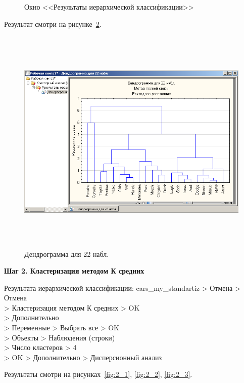 \begin{figure}[!h]
\begin{minipage}{0.32\textwidth}
    \caption{Окно <<Результаты иерархической классификации>>}
    \label{fig:1_6}
  \end{minipage}
\end{figure}

Результат смотри на рисунке~\ref{fig:1_7}.

\begin{figure}[!h]
  \centering

  \includegraphics[height=11cm]
  {inc/cars_my/1.7.PNG}

  \caption{Дендрограмма для 22 набл.}
  \label{fig:1_7}
\end{figure}

\newpage

\begin{center}
  \textbf{Шаг 2. Кластеризация методом К средних}
\end{center}

Результата иерархической классификации: cars\_my\_standartiz > Отмена > Отмена \\
> Кластеризация методом К средних > OK \\
> Дополнительно \\
> Переменные > Выбрать все > OK \\
> Объекты > Наблюдения (строки) \\
> Число кластеров > 4 \\
> OK > Дополнительно > Дисперсионный анализ

Результаты смотри на рисунках~\ref{fig:2_1}, \ref{fig:2_2}, \ref{fig:2_3}.

